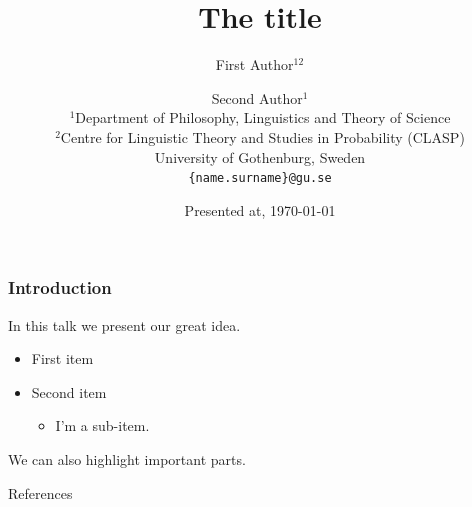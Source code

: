 \documentclass[aspectratio=1610]{beamer} %
\title{\color{guDarkBlue} The title}
\author{First Author$^{12}$ \and Second Author$^{1}$ \\
        $^{1}$Department of Philosophy, Linguistics and Theory of Science \\ 
        $^{2}$Centre for Linguistic Theory and Studies in Probability (CLASP) \\
        University of Gothenburg, Sweden \\
      \texttt{\{name.surname\}@gu.se}}
\date{Presented at, \today}
\newcommand{\highlight}[1]{{\color{guDarkBlue}#1}}
\begin{document}
\frame[plain]{\titlepage}










\begin{frame}

\frametitle{Introduction}

In this talk we present our great idea.

\begin{itemize}
  
\item First item

\item Second item
  \begin{itemize}

  \item I'm a sub-item.

  \end{itemize}

\end{itemize}

\bigskip

We can also highlight \highlight{important parts}.


\end{frame}






\begin{frame}[allowframebreaks]{References}

\small






\end{frame}
\end{document}

